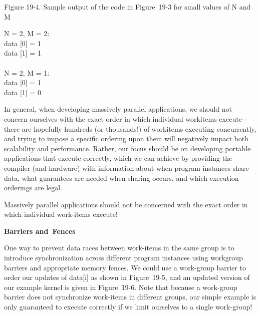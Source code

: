 \hspace*{\fill} \par %
Figure 19-4. Sample output of the code in Figure 19-3 for small values of N and M
\begin{tcolorbox}[colback=white,colframe=black]
N = 2, M = 2:\\
data [0] = 1\\
data [1] = 1\\
\\
N = 2, M = 1:\\
data [0] = 1\\
data [1] = 0
\end{tcolorbox}

In general, when developing massively parallel applications, we should not concern ourselves with the exact order in which individual workitems execute—there are hopefully hundreds (or thousands!) of workitems executing concurrently, and trying to impose a specific ordering upon them will negatively impact both scalability and performance. Rather, our focus should be on developing portable applications that execute correctly, which we can achieve by providing the compiler (and hardware) with information about when program instances share data, what guarantees are needed when sharing occurs, and which execution orderings are legal.\par

\begin{tcolorbox}[colback=red!5!white,colframe=red!75!black]
Massively parallel applications should not be concerned with the exact order in which individual work-items execute!
\end{tcolorbox}

\hspace*{\fill} \par %
\textbf{Barriers and Fences}

One way to prevent data races between work-items in the same group is to introduce synchronization across different program instances using workgroup barriers and appropriate memory fences. We could use a work-group barrier to order our updates of data[i] as shown in Figure 19-5, and an updated version of our example kernel is given in Figure 19-6. Note that because a work-group barrier does not synchronize work-items in different groups, our simple example is only guaranteed to execute correctly if we limit ourselves to a single work-group!\par

